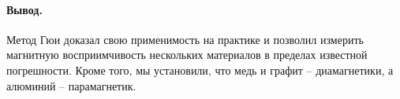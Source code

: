 \documentclass{lab_class}
\begin{document}
\paragraph{Вывод.}
Метод Гюи доказал свою применимость на практике и позволил измерить магнитную восприимчивость нескольких материалов в пределах известной погрешности. Кроме того, мы установили, что медь и графит -- диамагнетики, а алюминий -- парамагнетик.
\end{document}
